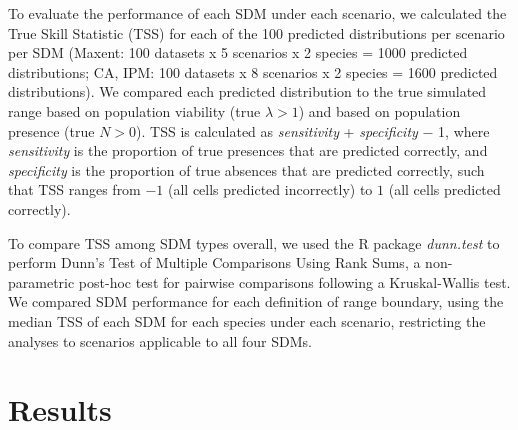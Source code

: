 \documentclass[preprint,review,times,12pt]{elsarticle}
\begin{document}
To evaluate the performance of each SDM under each scenario, we calculated the True Skill Statistic (TSS) \citep{Allouche2006} for each of the 100 predicted distributions per scenario per SDM (Maxent: 100 datasets x 5 scenarios x 2 species = 1000 predicted distributions; CA, IPM: 100 datasets x 8 scenarios x 2 species = 1600 predicted distributions). We compared each predicted distribution to the true simulated range based on population viability (true $\lambda > 1$) and based on population presence (true $N > 0$). TSS is calculated as \emph{sensitivity} + \emph{specificity} $-$ 1, where \emph{sensitivity} is the proportion of true presences that are predicted correctly, and \emph{specificity} is the proportion of true absences that are predicted correctly, such that TSS ranges from $-1$ (all cells predicted incorrectly) to $1$ (all cells predicted correctly).

To compare TSS among SDM types overall, we used the R package \emph{dunn.test} to perform Dunn's Test of Multiple Comparisons Using Rank Sums, a non-parametric post-hoc test for pairwise comparisons following a Kruskal-Wallis test. We compared SDM performance for each definition of range boundary, using the median TSS of each SDM for each species under each scenario, restricting the analyses to scenarios applicable to all four SDMs. 






\section{Results}
\label{S:3}

\end{document}
